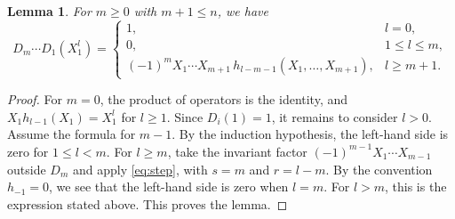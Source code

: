 \documentclass[11pt,a4paper,reqno]{amsart}
\DeclareRobustCommand{\rev}[1]{{\color{revision}#1}}
\numberwithin{equation}{section}
\newtheorem{lemma}[theorem]{Lemma}
\theoremstyle{definition}
\begin{document}
\begin{lemma}\label{lem:monomial}
For \(m\ge0\) with \(m+1\le n\), we have 
\[
 D_m\cdots D_1(X_1^l)=
 \begin{cases}
 1,& l=0,\\
 0,& 1\le l\le m,\\
 (-1)^mX_1\cdots X_{m+1}\,h_{l-m-1}(X_1,\ldots,X_{m+1}),&l\ge m+1 .
 \end{cases}
\]
\end{lemma}
\begin{proof}
\rev{For \(m=0\), the product of operators is the identity, and \(X_1 h_{l-1}(X_1)=X_1^l\) for \(l\ge1\). Since \(D_i(1)=1\), it remains to consider \(l>0\). Assume the formula for \(m-1\). By the induction hypothesis, the left-hand side is zero for \(1\le l<m\). For \(l\ge m\), take the invariant factor \((-1)^{m-1}X_1\cdots X_{m-1}\) outside \(D_m\) and apply \eqref{eq:step}, with \(s=m\) and \(r=l-m\). By the convention \(h_{-1}=0\), we see that the left-hand side is zero when \(l=m\). For \(l>m\), this is the expression stated above.}
This proves the lemma. 
\end{proof}
\end{document}
